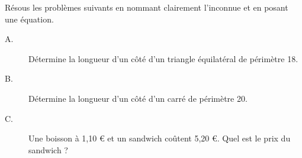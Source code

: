 
Résous les problèmes suivants en nommant clairement l'inconnue et en posant une équation.

\begin{description}
\item[A.] Détermine la longueur d'un côté d'un triangle équilatéral de périmètre 18.
\item[B.] Détermine la longueur d'un côté d'un carré de périmètre 20.
\item[C.] Une boisson à 1,10 € et un sandwich coûtent 5,20 €. Quel est le prix du sandwich ?  
\end{description}